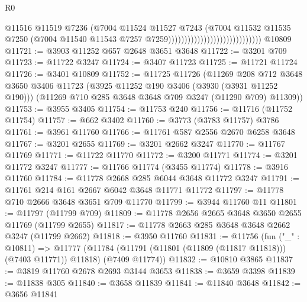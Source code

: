\begin{lexlean}{R0}
\begin{coremodule}
                                                        @11516
                                                        @11519
                                                        @7236
                                                        (@7004
                                                          @11524
                                                          @11527
                                                          @7243
                                                          (@7004
                                                            @11532
                                                            @11535
                                                            @7250
                                                            (@7004
                                                              @11540
                                                              @11543
                                                              @7257
                                                              @7259)))))))))))))))))))))))))))))
    @10809
@11721 := @3903 @11252 @657 @2648 @3651 @3648
@11722 := @3201 @709
@11723 := @11722 @3247
@11724 := @3407 @11723
@11725 := @11721 @11724
@11726 := @3401 @10809
@11752 := @11725
    @11726
    (@11269
      @208
      @712
      @3648
      @3650
      @3406
      @11723
      (@3925 @11252 @190 @3406 (@3930 (@3931 @11252 @190)))
      (@11269 @710 @285 @3648 @3648 @709 @3247 (@11290 @709) @11309))
@11753 := @3955 @3405
@11754 := @11753 @240
@11756 := @11716 (@11752 @11754)
@11757 := @662 @3402
@11760 := @3773 (@3783 @11757) @3786
@11761 := @3961 @11760
@11766 := @11761 @587 @2556 @2670 @6258 @3648
@11767 := @3201 @2655
@11769 := @3201 @2662 @3247
@11770 := @11767 @11769
@11771 := @11722 @11770
@11772 := @3200 @11771
@11774 := @3201 @11772 @3247
@11777 := @11766 @11774 (@3455 @11774)
@11778 := @3916 @11760
@11784 := @11778 @2668 @285 @6044 @3648 @11772 @3247
@11791 := @11761 @214 @161 @2667 @6042 @3648 @11771 @11772
@11797 := @11778 @710 @2666 @3648 @3651 @709 @11770
@11799 := @3944 @11760 @11
@11801 := @11797 (@11799 @709)
@11809 := @11778 @2656 @2665 @3648 @3650 @2655 @11769 (@11799 @2655)
@11817 := @11778 @2663 @285 @3648 @3648 @2662 @3247 (@11799 @2662)
@11818 := @3950 @11760
@11831 := @11756
    (fun ("_" : @10811) =>
    @11777 (@11784 (@11791 (@11801 (@11809 (@11817 @11818))) (@7403 @11771)) @11818) (@7409 @11774))
@11832 := @10810 @3865
@11837 := @3819 @11760 @2678 @2693 @3144 @3653
@11838 := @3659 @3398
@11839 := @11838 @305
@11840 := @3658 @11839
@11841 := @11840 @3648
@11842 := @3656 @11841

\end{coremodule}
\end{lexlean}
